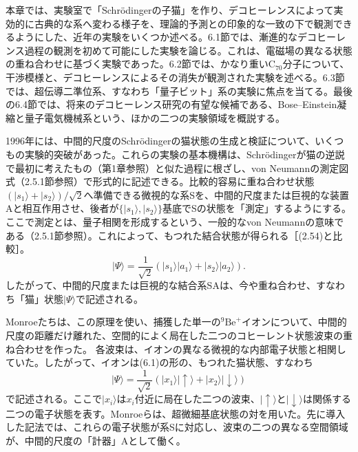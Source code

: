 本章では、実験室で「Schrödingerの子猫」を作り、デコヒーレンスによって実効的に古典的な系へ変わる様子を、理論的予測との印象的な一致の下で観測できるようにした、近年の実験をいくつか述べる。6.1節では、漸進的なデコヒーレンス過程の観測を初めて可能にした実験を論じる。これは、電磁場の異なる状態の重ね合わせに基づく実験であった。6.2節では、かなり重い$\mathrm C_{70}$分子について、干渉模様と、デコヒーレンスによるその消失が観測された実験を述べる。6.3節では、超伝導二準位系、すなわち「量子ビット」系の実験に焦点を当てる。最後の6.4節では、将来のデコヒーレンス研究の有望な候補である、Bose--Einstein凝縮と量子電気機械系という、ほかの二つの実験領域を概説する。

1996年には、中間的尺度のSchrödingerの猫状態の生成と検証について、いくつもの実験的突破があった。これらの実験の基本機構は、Schrödingerが猫の逆説で最初に考えたもの（第1章参照）と似た過程に根ざし、von Neumannの測定図式（2.5.1節参照）で形式的に記述できる。比較的容易に重ね合わせ状態$(|s_1\rangle+|s_2\rangle)/\sqrt2$へ準備できる微視的な系Sを、中間的尺度または巨視的な装置Aと相互作用させ、後者が$\{|s_1\rangle,|s_2\rangle\}$基底でSの状態を「測定」するようにする。ここで測定とは、量子相関を形成するという、一般的なvon Neumannの意味である（2.5.1節参照）。これによって、もつれた結合状態が得られる［(2.54)と比較］。
\begin{equation}
|\Psi\rangle=\frac1{\sqrt2}(|s_1\rangle|a_1\rangle+|s_2\rangle|a_2\rangle).\tag{6.1}
\end{equation}
したがって、中間的尺度または巨視的な結合系SAは、今や重ね合わせ、すなわち「猫」状態$|\Psi\rangle$で記述される。

Monroeたち\cite{ref246}は、この原理を使い、捕獲した単一の${}^9\mathrm{Be}^+$イオンについて、中間的尺度の距離だけ離れた、空間的によく局在した二つのコヒーレント状態波束の重ね合わせを作った。
\hypertarget{srcpage:245}{}\label{srcpage:245}
各波束は、イオンの異なる微視的な内部電子状態と相関していた。したがって、イオンは(6.1)の形の、もつれた猫状態、すなわち
\begin{equation}
|\Psi\rangle=\frac1{\sqrt2}(|x_1\rangle|\uparrow\rangle+|x_2\rangle|\downarrow\rangle)\tag{6.2}
\end{equation}
で記述される。ここで$|x_i\rangle$は$x_i$付近に局在した二つの波束、$|\uparrow\rangle$と$|\downarrow\rangle$は関係する二つの電子状態を表す。Monroeらは、超微細基底状態の対を用いた。先に導入した記法では、これらの電子状態が系Sに対応し、波束の二つの異なる空間領域が、中間的尺度の「計器」Aとして働く。


